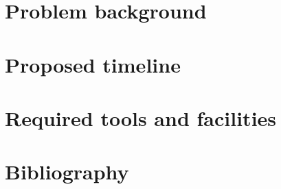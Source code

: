 \documentclass[12pt]{article}
\begin{document}
\section*{Problem background}

\section*{Proposed timeline}
   
\section*{Required tools and facilities}

\section*{Bibliography} %
\end{document}
